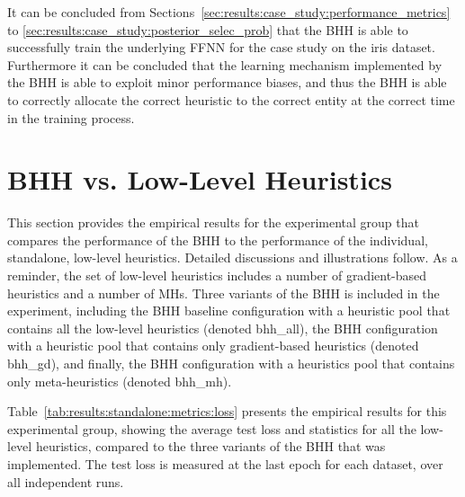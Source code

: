 It can be concluded from Sections~\ref{sec:results:case_study:performance_metrics} to \ref{sec:results:case_study:posterior_selec_prob} that the \acs{BHH} is able to successfully train the underlying \acs{FFNN} for the case study on the iris dataset. Furthermore it can be concluded that the learning mechanism implemented by the \acs{BHH} is able to exploit minor performance biases, and thus the \acs{BHH} is able to correctly allocate the correct heuristic to the correct entity at the correct time in the training process.

\section{BHH vs. Low-Level Heuristics}\label{sec:results:standalone}

This section provides the empirical results for the experimental group that compares the performance of the \acs{BHH} to the performance of the individual, standalone, low-level heuristics. Detailed discussions and illustrations follow. As a reminder, the set of low-level heuristics includes a number of gradient-based heuristics and a number of \acp{MH}. Three variants of the \acs{BHH} is included in the experiment, including the \acs{BHH} baseline configuration with a heuristic pool that contains all the low-level heuristics (denoted bhh\_all), the \acs{BHH} configuration with a heuristic pool that contains only gradient-based heuristics (denoted bhh\_gd), and finally, the \acs{BHH} configuration with a heuristics pool that contains only meta-heuristics (denoted bhh\_mh).

Table~\ref{tab:results:standalone:metrics:loss} presents the empirical results for this experimental group, showing the average test loss and statistics for all the low-level heuristics, compared to the three variants of the \acs{BHH} that was implemented. The test loss is measured at the last epoch for each dataset, over all independent runs.

